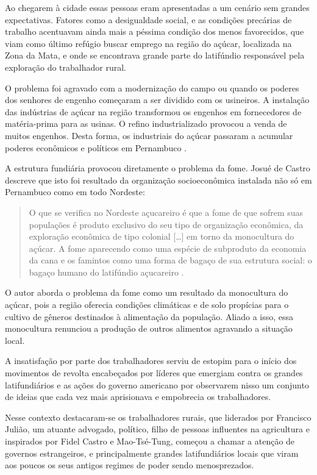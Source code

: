 \begin{refsection}
    Ao chegarem à cidade essas pessoas eram apresentadas a um cenário sem grandes expectativas. Fatores como a desigualdade social, e as condições precárias de trabalho acentuavam ainda mais a péssima condição dos menos favorecidos, que viam como último refúgio buscar emprego na região do açúcar, localizada na Zona da Mata, e onde se encontrava grande parte do latifúndio responsável pela exploração do trabalhador rural. 

    O problema foi agravado com a modernização do campo ou quando os poderes dos senhores de engenho começaram a ser dividido com os usineiros. A instalação das indústrias de açúcar na região transformou os engenhos em fornecedores de matéria-prima para as usinas. O refino industrializado provocou a venda de muitos engenhos. Desta forma, os industriais do açúcar passaram a acumular poderes econômicos e políticos em Pernambuco \cite[p.~37]{Page1972Revolucao}. 

    A estrutura fundiária provocou diretamente o problema da fome. Josué de Castro descreve que isto foi resultado da organização socioeconômica instalada não só em Pernambuco como em todo Nordeste: 

    \begin{quotation}
        O que se verifica no Nordeste açucareiro é que a fome de que sofrem suas populações é produto exclusivo do seu tipo de organização econômica, da exploração econômica de tipo colonial [\dots] em torno da monocultura do açúcar. A fome aparecendo como uma espécie de subproduto da economia da cana e os famintos como uma forma de bagaço de sua estrutura social: o bagaço humano do latifúndio açucareiro \cite[p.~73]{Castro1975Sete}.
    \end{quotation}

    O autor aborda o problema da fome como um resultado da monocultura do açúcar, pois a região oferecia condições climáticas e de solo propícias para o cultivo de gêneros destinados à alimentação da população. Aliado a isso, essa monocultura renunciou a produção de outros alimentos agravando a situação local.  

    A insatisfação por parte dos trabalhadores serviu de estopim para o início dos movimentos de revolta encabeçados por líderes que emergiam contra os grandes latifundiários e as ações do governo americano por observarem nisso um conjunto de ideias que cada vez mais aprisionava e empobrecia os trabalhadores. 

    Nesse contexto destacaram-se os trabalhadores rurais, que liderados por Francisco Julião, um atuante advogado, político, filho de pessoas influentes na agricultura e inspirados por Fidel Castro e Mao-Tsé-Tung, começou a chamar a atenção de governos estrangeiros, e principalmente grandes latifundiários locais que viram aos poucos os seus antigos regimes de poder sendo menosprezados. 


\end{refsection}
